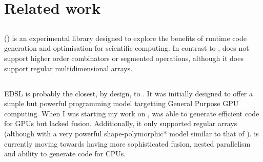 \documentclass[preamble.tex]{subfiles}
\begin{document}



\clearpage
\section{Related work}

\subsection{}
\label{sec:DESOLA}

 () \cite{RMKB06} is an experimental  library designed to explore the benefits of runtime code generation and optimisation for scientific computing. In contrast to \DPH,  does not support higher order combinators or segmented operations, although it does support regular multidimensional arrays.


\subsection{}

 EDSL\iedsl \cite{CKL+11, McDonell:2013wi, CliftonEverest:2014vi} is probably the closest, by design, to \LiveFusion. It was initially designed to offer a simple but powerful programming model targetting General Purpose GPU computing. When I was starting my work on \LiveFusion,  was able to generate efficient code for GPUs but lacked fusion. Additionally, it only supported regular arrays (although with a very powerful \*shape-polymorphic* model similar to that of \Repa \cite{KCL+10}).  is currently moving towards having more sophisticated fusion, nested parallelism and ability to generate code for CPUs.


\subsection{\FlowFusion}
\label{sec:Fronted-FlowFusion}
\end{document}
